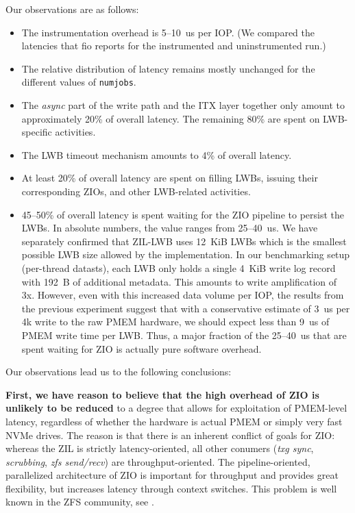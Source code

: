\documentclass[12pt,a4paper,twoside]{book}
\begin{document}
Our observations are as follows:
\begin{itemize}[noitemsep]
    \item The instrumentation overhead is 5--\SI{10}{us} per IOP. (We compared the latencies that fio reports for the instrumented and uninstrumented run.)
    \item The relative distribution of latency remains mostly unchanged for the different values of \lstinline{numjobs}.
    \item The \textit{async} part of the write path and the ITX layer together only amount to approximately 20\% of overall latency.
        The remaining 80\% are spent on LWB-specific activities.
    \item The LWB timeout mechanism amounts to 4\% of overall latency.
    \item At least 20\% of overall latency are spent on filling LWBs, issuing their corresponding ZIOs, and other LWB-related activities.
    \item 45--50\% of overall latency is spent waiting for the ZIO pipeline to persist the LWBs.
        In absolute numbers, the value ranges from 25--\SI{40}{us}.
        We have separately confirmed that ZIL-LWB uses \SI{12}{KiB} LWBs which is the smallest possible LWB size allowed by the implementation.
        In our benchmarking setup (per-thread datasts), each LWB only holds a single \SI{4}{KiB} write log record with \SI{192}{B} of additional metadata.
        This amounts to write amplification of 3x.
        However, even with this increased data volume per IOP, the results from the previous experiment suggest that with a conservative estimate of \SI{3}{us} per 4k write to the raw PMEM hardware, we should expect less than \SI{9}{us} of PMEM write time per LWB.
        Thus, a major fraction of the 25--\SI{40}{us} that are spent waiting for ZIO is actually pure software overhead.
\end{itemize}

Our observations lead us to the following conclusions:

\textbf{First, we have reason to believe that the high overhead of ZIO is unlikely to be reduced} to a degree that allows for exploitation of PMEM-level latency, regardless of whether the hardware is actual PMEM or simply very fast NVMe drives.
The reason is that there is an inherent conflict of goals for ZIO:
whereas the ZIL is strictly latency-oriented, all other conumers (\textit{txg sync}, \textit{scrubbing}, \textit{zfs send/recv}) are throughput-oriented.
The pipeline-oriented, parallelized architecture of ZIO is important for throughput and provides great flexibility, but increases latency through context switches.
This problem is well known in the ZFS community, see \cite{openzfsZILPerformanceImprovements2020}.
\end{document}
